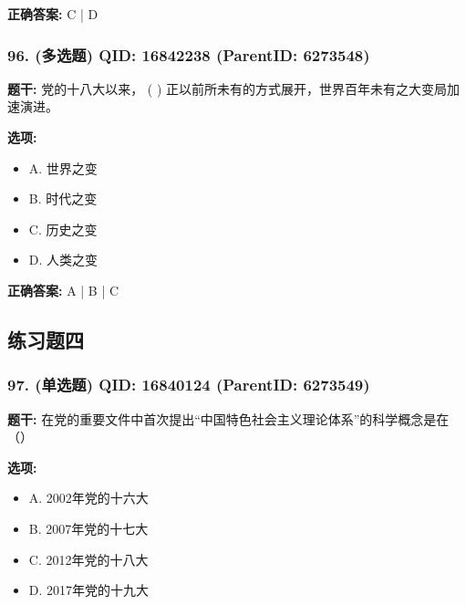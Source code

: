 \documentclass[12pt,UTF8]{ctexart}
\begin{document}
\textbf{正确答案:}
C | D

\vspace{0.3em}\hrulefill\vspace{0.7em}

\subsubsection*{96. (多选题) \small QID: 16842238 (ParentID: 6273548)}

\textbf{题干:}
党的十八大以来， ( ) 正以前所未有的方式展开，世界百年未有之大变局加速演进。



\textbf{选项:}
\begin{itemize}[leftmargin=*]

  \item A. 世界之变

  \item B. 时代之变

  \item C. 历史之变

  \item D. 人类之变

\end{itemize}

\textbf{正确答案:}
A | B | C

\vspace{0.3em}\hrulefill\vspace{0.7em}

\subsection*{练习题四}

\subsubsection*{97. (单选题) \small QID: 16840124 (ParentID: 6273549)}

\textbf{题干:}
在党的重要文件中首次提出“中国特色社会主义理论体系”的科学概念是在（）



\textbf{选项:}
\begin{itemize}[leftmargin=*]

  \item A. 2002年党的十六大

  \item B. 2007年党的十七大

  \item C. 2012年党的十八大

  \item D. 2017年党的十九大

\end{itemize}
\end{document}
